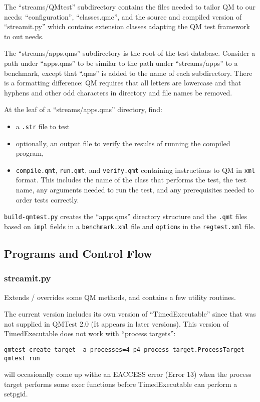 \documentclass[11pt]{article}
\begin{document}
The ``streams/QMtest'' subdirectory contains the files needed to
tailor QM to our needs:  ``configuration'', ``classes.qmc'', and the
source and compiled version of ``streamit.py'' which contains extension
classes adapting the QM test framework to out needs.

The ``streams/apps.qms'' subdirectory is the root of the test
database.  Consider a path under ``apps.qms'' to be similar to the
path under ``streams/apps'' to a benchmark, except that ``.qms'' is
added to the name of each subdirectory.  There is a formatting
difference: QM requires that all letters are lowercase and that
hyphens and other odd characters in directory and file names be
removed.

At the leaf of a  ``streams/apps.qms'' directory, find: 
\begin{itemize}
\item a {\tt .str} file to test
\item optionally, an output file to verify the results of running the 
compiled program,
\item {\tt compile.qmt}, {\tt run.qmt}, and {\tt verify.qmt}
containing instructions to QM in {\tt xml} format.
This includes the name of the class that performs the test, the test
name, any arguments needed to run the test, and any prerequisites
needed to order tests correctly.
\end{itemize}
{\tt build-qmtest.py} creates the ``apps.qms'' directory structure and
the {\tt .qmt} files based on {\tt impl} fields in a {\tt benchmark.xml}
file and {\tt option}s in the {\tt regtest.xml} file.

\subsection{Programs and Control Flow}

\subsubsection{streamit.py}
Extends / overrides some QM methods, and contains a few utility routines.

The current version includes its own version of ``TimedExecutable''
since that was not supplied in QMTest 2.0 (It appears in later
versions).  This version of TimedExecutable does not work with
``process targets'':
\begin{verbatim}
qmtest create-target -a processes=4 p4 process_target.ProcessTarget
qmtest run
\end{verbatim}
will occasionally come up withe an EACCESS error (Error 13) when the
process target performs some exec functions before TimedExecutable can
perform a setpgid.
\end{document}
